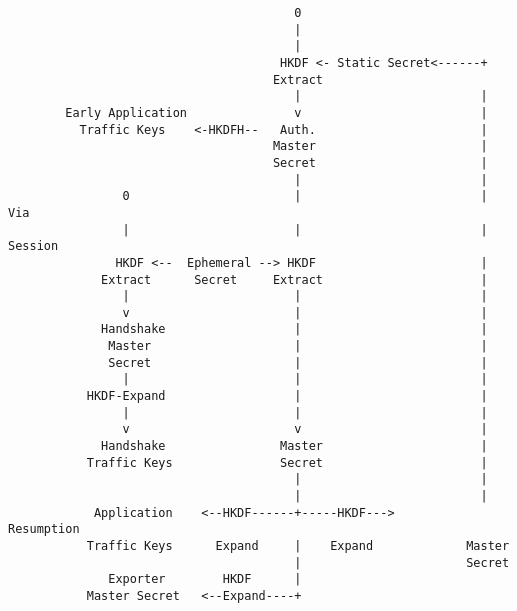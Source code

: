 \documentclass[helvetica]{seminar}
\begin{document}
\begin{slide}
\vspace{-1.3in}
{\tiny
\begin{verbatim}
                                        0
                                        |                         
                                        |                         
                                      HKDF <- Static Secret<------+
                                     Extract
                                        |                         |
        Early Application               v                         |
          Traffic Keys    <-HKDFH--   Auth.                       |
                                     Master                       |
                                     Secret                       |
                                        |                         |
                0                       |                         | Via
                |                       |                         | Session
               HKDF <--  Ephemeral --> HKDF                       |
             Extract      Secret     Extract                      |
                |                       |                         |
                v                       |                         |
             Handshake                  |                         |
              Master                    |                         |
              Secret                    |                         |
                |                       |                         |
           HKDF-Expand                  |                         |
                |                       |                         |
                v                       v                         |
             Handshake                Master                      |
           Traffic Keys               Secret                      |
                                        |                         |
                                        |                         |
            Application    <--HKDF------+-----HKDF--->        Resumption        
           Traffic Keys      Expand     |    Expand             Master
                                        |                       Secret  
              Exporter        HKDF      |
           Master Secret   <--Expand----+
\end{verbatim}
}
\end{slide}
\end{document}
